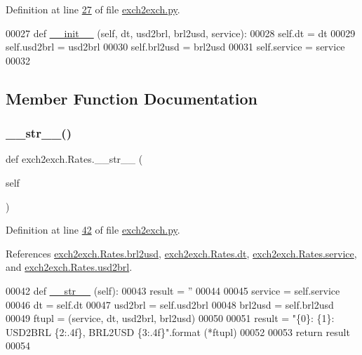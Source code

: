 Definition at line \hyperlink{exch2exch_8py_source_l00027}{27} of file \hyperlink{exch2exch_8py_source}{exch2exch.\+py}.


\begin{DoxyCode}
00027     \textcolor{keyword}{def }\hyperlink{namespacestart__time_a9c9bd378729a13c96a22c8b079ea172c}{\_\_init\_\_} (self, dt, usd2brl, brl2usd, service):
00028         self.dt  = dt
00029         self.usd2brl = usd2brl
00030         self.brl2usd = brl2usd
00031         self.service = service
00032     
\end{DoxyCode}


\subsection{Member Function Documentation}
\mbox{\label{classexch2exch_1_1_rates_aa1f9446c881b72b6229b05a65b84474c}} 
\subsubsection{\texorpdfstring{\+\_\+\+\_\+str\+\_\+\+\_\+()}{\_\_str\_\_()}}
{\footnotesize\ttfamily def exch2exch.\+Rates.\+\_\+\+\_\+str\+\_\+\+\_\+ (\begin{DoxyParamCaption}\item[{}]{self }\end{DoxyParamCaption})}



Definition at line \hyperlink{exch2exch_8py_source_l00042}{42} of file \hyperlink{exch2exch_8py_source}{exch2exch.\+py}.



References \hyperlink{exch2exch_8py_source_l00030}{exch2exch.\+Rates.\+brl2usd}, \hyperlink{exch2exch_8py_source_l00028}{exch2exch.\+Rates.\+dt}, \hyperlink{exch2exch_8py_source_l00031}{exch2exch.\+Rates.\+service}, and \hyperlink{exch2exch_8py_source_l00029}{exch2exch.\+Rates.\+usd2brl}.


\begin{DoxyCode}
00042     \textcolor{keyword}{def }\hyperlink{namespacerates_a2f1a70c33ee9e255938e4c19fd207264}{\_\_str\_\_} (self):
00043         result = \textcolor{stringliteral}{''}
00044 
00045         service = self.service
00046         dt      = self.dt
00047         usd2brl = self.usd2brl
00048         brl2usd = self.brl2usd
00049         ftupl = (service, dt, usd2brl, brl2usd)
00050         
00051         result = \textcolor{stringliteral}{"\{0\}: \{1\}: USD2BRL \{2:.4f\}, BRL2USD \{3:.4f\}"}.format (*ftupl)
00052 
00053         \textcolor{keywordflow}{return} result        
00054         
\end{DoxyCode}
\mbox{\label{classexch2exch_1_1_rates_a2ff10f54055363d36aef301f29068dad}} 
